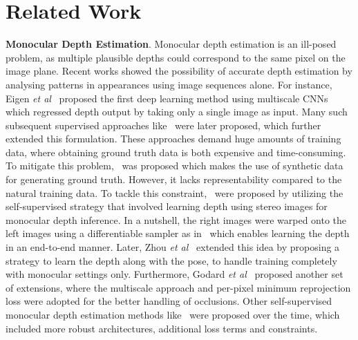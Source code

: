\documentclass{bmvc2k}
\def\etal{\emph{et al}\bmvaOneDot}
\begin{document}
\section{Related Work}
\label{sec:rel_work}
\textbf{Monocular Depth Estimation}. Monocular depth estimation is an ill-posed problem, as multiple plausible depths could correspond to the same pixel on the image plane. Recent works showed the possibility of accurate depth estimation by analysing patterns in appearances using image sequences alone. For instance, Eigen \etal~\cite{eigen} proposed the first deep learning method using multiscale CNNs which regressed depth output by taking only a single image as input. Many such subsequent supervised approaches like~\cite{wang2015designing, fu2018deep, guo2018learning} were later proposed, which further extended this formulation. These approaches demand huge amounts of training data, where obtaining ground truth data is both expensive and time-consuming. To mitigate this problem,~\cite{mayer2018makes} was proposed which makes the use of synthetic data for generating ground truth. However, it lacks representability compared to the natural training data. To tackle this constraint,~\cite{garg2016unsupervised, godard2017unsupervised} were proposed by utilizing the self-supervised strategy that involved learning depth using stereo images for monocular depth inference. In a nutshell, the right images were warped onto the left images using a differentiable sampler as in~\cite{jaderberg2015spatial} which enables learning the depth in an end-to-end manner. Later, Zhou \etal~\cite{zhou2017unsupervised} extended this idea by proposing a strategy to learn the depth along with the pose, to handle training completely with monocular settings only. Furthermore, Godard \etal~\cite{godard2019digging} proposed another set of extensions, where the multiscale approach and per-pixel minimum reprojection loss were adopted for the better handling of occlusions. Other self-supervised monocular depth estimation methods like~\cite{vijayanarasimhan2017sfm, yin2018geonet, ranjan2019competitive, casser2019depth, pillai2019superdepth, guizilini20203d} were proposed over the time, which included more robust architectures, additional loss terms and constraints.
\end{document}

